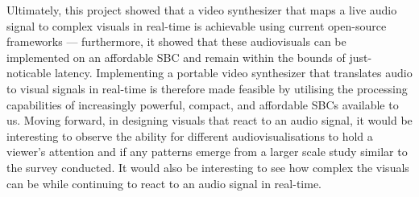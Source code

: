 \documentclass{report}
\begin{document}
Ultimately, this project showed that a video synthesizer that maps a live audio signal to complex visuals in real-time is achievable using current open-source frameworks --- furthermore, it showed that these audiovisuals can be implemented on an affordable SBC and remain within the bounds of just-noticable latency. Implementing a portable video synthesizer that translates audio to visual signals in real-time is therefore made feasible by utilising the processing capabilities of increasingly powerful, compact, and affordable SBCs available to us. Moving forward, in designing visuals that react to an audio signal, it would be interesting to observe the ability for different audiovisualisations to hold a viewer's attention and if any patterns emerge from a larger scale study similar to the survey conducted. It would also be interesting to see how complex the visuals can be while continuing to react to an audio signal in real-time.
\printbibliography

\begin{appendices}
  
\end{appendices}
\end{document}
